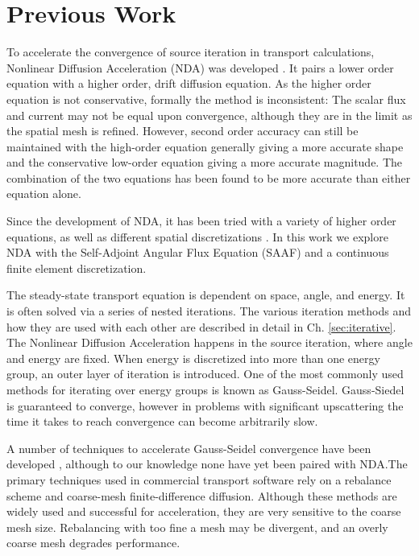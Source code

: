 \section{Previous Work}
To accelerate the convergence of source iteration in transport calculations, Nonlinear Diffusion Acceleration (NDA) was developed \cite{Knoll2011} \cite{park-nda}. It pairs a lower order equation with a higher order, drift diffusion equation. As the higher order equation is not conservative, formally the method is inconsistent: The scalar flux and current may not be equal upon convergence, although they are in the limit as the spatial mesh is refined. However, second order accuracy can still be maintained with the high-order equation generally giving a more accurate shape and the conservative low-order equation giving a more accurate magnitude. The combination of the two equations has been found to be more accurate than either equation alone. \cite{morel-holo} \par
Since the development of NDA, it has been tried with a variety of higher order equations, \cite{morel-holo}\cite{Wang2013} as well as different spatial discretizations \cite{morel-holo}\cite{Schunert2017}. In this work we explore NDA with the Self-Adjoint Angular Flux Equation (SAAF) and a continuous finite element discretization. \par
The steady-state transport equation is dependent on space, angle, and energy. It is often solved via a series of nested iterations. The various iteration methods and how they are used with each other are described in detail in Ch. \ref{sec:iterative}. The Nonlinear Diffusion Acceleration happens in the source iteration, where angle and energy are fixed. When energy is discretized into more than one energy group, an outer layer of iteration is introduced. One of the most commonly used methods for iterating over energy groups is known as Gauss-Seidel. Gauss-Siedel is guaranteed to converge, however in problems with significant upscattering the time it takes to reach convergence can become arbitrarily slow. 
\par
A number of techniques to accelerate Gauss-Seidel convergence have been developed \cite{morel-upscat} \cite{evans-upscat}, although to our knowledge none have yet been paired with NDA.The primary techniques used in commercial transport software rely on a rebalance scheme and coarse-mesh finite-difference diffusion. Although these methods are widely used and successful for acceleration, they are very sensitive to the coarse mesh size. Rebalancing with too fine a mesh may be divergent, and an overly coarse mesh degrades performance. \cite{evans-upscat}
